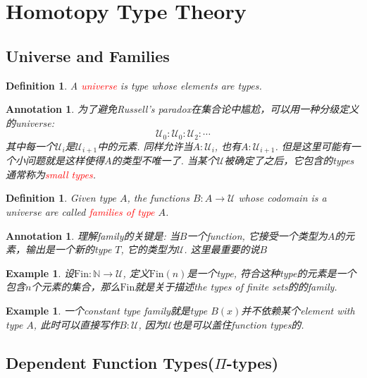 \documentclass{article}
\newtheorem{example}[theorem]{Example}
\newtheorem{definition}[theorem]{Definition}
\newtheorem{annotation}[theorem]{Annotation}
\newcommand{\redt}[1]{\textcolor{red}{#1}}
\begin{document}
\newpage
\section{Homotopy Type Theory}

\subsection{Universe and Families}

\begin{definition}
\rm A \redt{universe} is type whose elements are types.
\end{definition}

\begin{annotation}
\rm 为了避免Russell's paradox在集合论中尴尬，可以用一种分级定义的universe:
\[
	\mathcal{U}_0 : \mathcal{U}_0 :\mathcal{U}_2 : \cdots
\]
其中每一个$\mathcal{U}_i$是$\mathcal{U}_{i+1}$中的元素. 同样允许当$A:\mathcal{U}_i$, 也有$A : \mathcal{U}_{i+1}$. 但是这里可能有一个小问题就是这样使得$A$的类型不唯一了. 当某个$\mathcal{U}$被确定了之后，它包含的types通常称为\redt{small types}.
\end{annotation}

\begin{definition}
\rm Given type $A$, the functions $B: A \to \mathcal{U}$ whose codomain is a universe are called \redt{families of type} $A$.
\end{definition}

\begin{annotation}
\rm 理解family的关键是: 当$B$一个function, 它接受一个类型为$A$的元素，输出是一个新的type $T$, 它的类型为$\mathcal{U}$. 这里最重要的说$B$   
\end{annotation}

\begin{example}\label{ex:family_fin}
\rm 设$\text{Fin}:\mathbb{N} \to \mathcal{U}$, 定义$\text{Fin}(n)$是一个type, 符合这种type的元素是一个包含$n$个元素的集合，那么$\text{Fin}$就是关于描述the types of finite sets的的family.
\end{example}


\begin{example}
\rm 一个constant type family就是type $B(x)$并不依赖某个element with type $A$, 此时可以直接写作$B:\mathcal{U}$, 因为$\mathcal{U}$也是可以盖住function types的. 
\end{example}

\subsection{Dependent Function Types(\texorpdfstring{$\Pi$}{pi}-types)}
\end{document}
